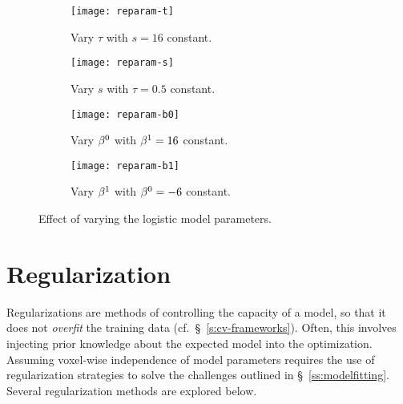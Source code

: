 \begin{figure}
  \centering
  \begin{subfigure}{\plotwidth}
    \texttt{[image: reparam-t]}
    \caption{Vary $\tau$ with $s = 16$ constant.}%
    \label{fig:reparam-t}
  \end{subfigure}
  \begin{subfigure}{\plotwidth}
    \texttt{[image: reparam-s]}
    \caption{Vary $s$ with $\tau = 0.5$ constant.}%
    \label{fig:reparam-s}
  \end{subfigure}
  \begin{subfigure}{\plotwidth}
    \texttt{[image: reparam-b0]}
    \caption{Vary $\beta^0$ with $\beta^1 = 16$ constant.}%
    \label{fig:reparam-b0}
  \end{subfigure}
  \begin{subfigure}{\plotwidth}
    \texttt{[image: reparam-b1]}
    \caption{Vary $\beta^1$ with $\beta^0 = -6$ constant.}%
    \label{fig:reparam-b1}
  \end{subfigure}
  \caption{Effect of varying the logistic model parameters.}%
  \label{fig:reparam}
\end{figure}
\section{Regularization}\label{s:vlr-reg}
Regularizations are methods of controlling the capacity of a model,
so that it does not \textit{overfit} the training data (cf.~\S~\ref{s:cv-frameworks}).
Often, this involves injecting prior knowledge about the expected model into the optimization.
Assuming voxel-wise independence of model parameters requires the use of regularization strategies
to solve the challenges outlined in \S~\ref{ss:modelfitting}.
Several regularization methods are explored below.
